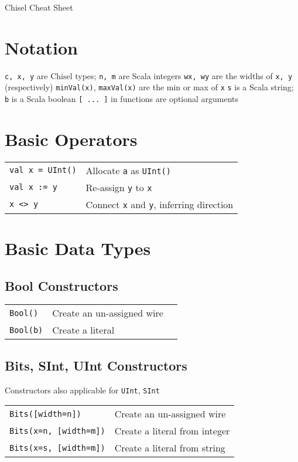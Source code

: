 \documentclass[10pt,landscape]{article}
\begin{document}
\begin{multicols}{3}

\begin{center}
\Large{Chisel Cheat Sheet}
\end{center}

\renewcommand{\tabcolsep}{.5mm}

\section{Notation}
\verb$c, x, y$ are Chisel types; \verb$n, m$ are Scala integers \newline
\verb$wx, wy$ are the widths of \verb$x, y$ (respectively) \newline
\verb$minVal(x)$, \verb$maxVal(x)$ are the min or max of \verb$x$ \newline
\verb$s$ is a Scala string; \verb$b$ is a Scala boolean \newline
\verb$[ ... ]$ in functions are optional arguments

\section{Basic Operators}
\begin{tabular}{l l}
\verb$val x = UInt()$ & Allocate \verb$a$ as \verb$UInt()$ \\
\verb$val x := y$ & Re-assign \verb$y$ to \verb$x$ \\
\verb$x <> y$ & Connect \verb$x$ and \verb$y$, inferring direction \\
\end{tabular}

\section{Basic Data Types}
\subsection{Bool Constructors}
\begin{tabular}{l l l}
\verb$Bool()$ & Create an un-assigned wire \\
\verb$Bool(b)$ & Create a literal \\
\end{tabular}

\subsection{Bits, SInt, UInt Constructors}
Constructors also applicable for \verb$UInt$, \verb$SInt$ \newline
\begin{tabular}{l l}
\verb$Bits([width=n])$ & Create an un-assigned wire \\
\verb$Bits(x=n, [width=m])$ & Create a literal from integer \\
\verb$Bits(x=s, [width=m])$ & Create a literal from string \\
\end{tabular}


\end{multicols}
\end{document}
